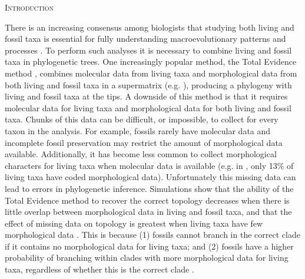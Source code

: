 \documentclass[12pt,letterpaper]{article}
\renewcommand{\section}[1]{%
\bigskip
\begin{center}
\begin{Large}
\normalfont\scshape #1
\medskip
\end{Large}
\end{center}}
\begin{document}

\vspace{1.5in}

%
%
\newpage 
\section{Introduction}

There is an increasing consensus among biologists that studying both living and fossil taxa is essential for fully understanding macroevolutionary patterns and processes \cite{slaterunifying2013,fritzdiversity2013}.
To perform such analyses it is necessary to combine living and fossil taxa in phylogenetic trees.
One increasingly popular method, the Total Evidence method \cite{eernissetaxonomic1993,ronquista2012}, combines molecular data from living taxa and morphological data from both living and fossil taxa in a supermatrix (e.g. \cite{pyrondivergence2011,ronquista2012,schragocombining2013,slaterunifying2013,beckancient2014}), producing a phylogeny with living and fossil taxa at the tips. 
A downside of this method is that it requires molecular data for living taxa and morphological data for both living and fossil taxa.
Chunks of this data can be difficult, or impossible, to collect for every taxon in the analysis.
For example, fossils rarely have molecular data and incomplete fossil preservation may restrict the amount of morphological data available.
Additionally, it has become less common to collect morphological characters for living taxa when molecular data is available (e.g. in \cite{slaterphylogenetic2013}, only 13\% of living taxa have coded morphological data).
Unfortunately this missing data can lead to errors in phylogenetic inference.
Simulations show that the ability of the Total Evidence method to recover the correct topology decreases when there is little overlap between morphological data in living and fossil taxa, and that the effect of missing data on topology is greatest when living taxa have few morphological data \cite{GuillermeCooper}.
This is because (1) fossils cannot branch in the correct clade if it contains no morphological data for living taxa; and (2) fossils have a higher probability of branching within clades with more morphological data for living taxa, regardless of whether this is the correct clade \cite{GuillermeCooper}. 
\end{document}
